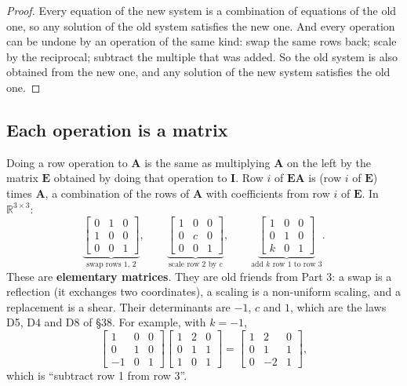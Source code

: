 \documentclass[11pt]{article}
\theoremstyle{plain}
\theoremstyle{definition}
\theoremstyle{remark}
\newcommand{\R}{\mathbb{R}}
\newcommand{\mt}[1]{\mathbf{#1}}
\begin{document}
\begin{proof}
Every equation of the new system is a combination of equations of the old one,
so any solution of the old system satisfies the new one. And every operation can
be undone by an operation of the same kind: swap the same rows back; scale by the
reciprocal; subtract the multiple that was added. So the old system is also
obtained from the new one, and any solution of the new system satisfies the old
one.
\end{proof}

\subsection{Each operation is a matrix}
Doing a row operation to $\mt{A}$ is the same as multiplying $\mt{A}$ on the
left by the matrix $\mt{E}$ obtained by doing that operation to $\mt{I}$.
Row $i$ of $\mt{E}\mt{A}$ is (row $i$ of $\mt{E}$) times $\mt{A}$, a combination
of the rows of $\mt{A}$ with coefficients from row $i$ of $\mt{E}$. In $\R^{3\times3}$:
\[
  \underbrace{\begin{bmatrix}0&1&0\\1&0&0\\0&0&1\end{bmatrix}}_{\text{swap rows 1, 2}},
  \qquad
  \underbrace{\begin{bmatrix}1&0&0\\0&c&0\\0&0&1\end{bmatrix}}_{\text{scale row 2 by }c},
  \qquad
  \underbrace{\begin{bmatrix}1&0&0\\0&1&0\\k&0&1\end{bmatrix}}_{\text{add }k\text{ row 1 to row 3}}.
\]
These are \textbf{elementary matrices}. They are old friends from Part 3: a swap
is a reflection (it exchanges two coordinates), a scaling is a non-uniform
scaling, and a replacement is a shear. Their determinants are $-1$, $c$ and $1$,
which are the laws D5, D4 and D8 of \S38. For example, with $k=-1$,
\[
  \begin{bmatrix}1&0&0\\0&1&0\\-1&0&1\end{bmatrix}
  \begin{bmatrix}1&2&0\\0&1&1\\1&0&1\end{bmatrix}
  =\begin{bmatrix}1&2&0\\0&1&1\\0&-2&1\end{bmatrix},
\]
which is ``subtract row 1 from row 3''.
\end{document}
